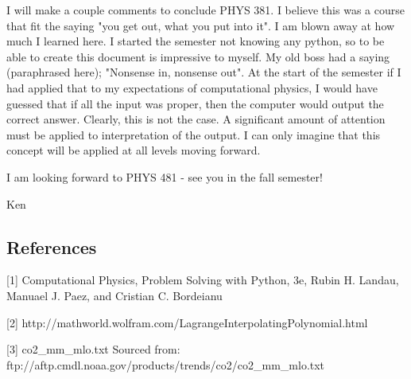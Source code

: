 \documentclass[11pt]{article}
\begin{document}
I will make a couple comments to conclude PHYS 381. I believe this was a
course that fit the saying "you get out, what you put into it". I am
blown away at how much I learned here. I started the semester not
knowing any python, so to be able to create this document is impressive
to myself. My old boss had a saying (paraphrased here); "Nonsense in,
nonsense out". At the start of the semester if I had applied that to my
expectations of computational physics, I would have guessed that if all
the input was proper, then the computer would output the correct answer.
Clearly, this is not the case. A significant amount of attention must be
applied to interpretation of the output. I can only imagine that this
concept will be applied at all levels moving forward.

I am looking forward to PHYS 481 - see you in the fall semester!

Ken

    \subsection{References}\label{references}

{[}1{]} Computational Physics, Problem Solving with Python, 3e, Rubin H.
Landau, Manuael J. Paez, and Cristian C. Bordeianu

{[}2{]}
http://mathworld.wolfram.com/LagrangeInterpolatingPolynomial.html

{[}3{]} co2\_mm\_mlo.txt Sourced from:
ftp://aftp.cmdl.noaa.gov/products/trends/co2/co2\_mm\_mlo.txt


    
    
    
    
\end{document}
